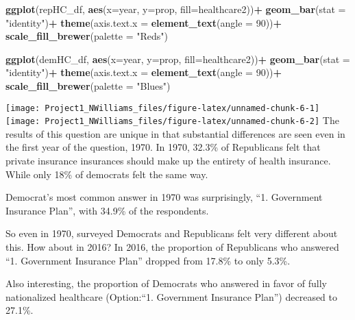 \documentclass[
]{article}
\newenvironment{Shaded}{\begin{snugshade}}{\end{snugshade}}
\newcommand{\DataTypeTok}[1]{\textcolor[rgb]{0.13,0.29,0.53}{#1}}
\newcommand{\DecValTok}[1]{\textcolor[rgb]{0.00,0.00,0.81}{#1}}
\newcommand{\KeywordTok}[1]{\textcolor[rgb]{0.13,0.29,0.53}{\textbf{#1}}}
\newcommand{\NormalTok}[1]{#1}
\newcommand{\OperatorTok}[1]{\textcolor[rgb]{0.81,0.36,0.00}{\textbf{#1}}}
\newcommand{\StringTok}[1]{\textcolor[rgb]{0.31,0.60,0.02}{#1}}
\begin{document}
\begin{Shaded}
\begin{Highlighting}[]
\KeywordTok{ggplot}\NormalTok{(repHC_df, }\KeywordTok{aes}\NormalTok{(}\DataTypeTok{x=}\NormalTok{year, }\DataTypeTok{y=}\NormalTok{prop, }\DataTypeTok{fill=}\NormalTok{healthcare2))}\OperatorTok{+}
\StringTok{  }\KeywordTok{geom_bar}\NormalTok{(}\DataTypeTok{stat =} \StringTok{"identity"}\NormalTok{)}\OperatorTok{+}
\StringTok{  }\KeywordTok{theme}\NormalTok{(}\DataTypeTok{axis.text.x =} \KeywordTok{element_text}\NormalTok{(}\DataTypeTok{angle =} \DecValTok{90}\NormalTok{))}\OperatorTok{+}
\StringTok{  }\KeywordTok{scale_fill_brewer}\NormalTok{(}\DataTypeTok{palette =} \StringTok{"Reds"}\NormalTok{)}

\KeywordTok{ggplot}\NormalTok{(demHC_df, }\KeywordTok{aes}\NormalTok{(}\DataTypeTok{x=}\NormalTok{year, }\DataTypeTok{y=}\NormalTok{prop, }\DataTypeTok{fill=}\NormalTok{healthcare2))}\OperatorTok{+}
\StringTok{  }\KeywordTok{geom_bar}\NormalTok{(}\DataTypeTok{stat =} \StringTok{"identity"}\NormalTok{)}\OperatorTok{+}
\StringTok{  }\KeywordTok{theme}\NormalTok{(}\DataTypeTok{axis.text.x =} \KeywordTok{element_text}\NormalTok{(}\DataTypeTok{angle =} \DecValTok{90}\NormalTok{))}\OperatorTok{+}
\StringTok{  }\KeywordTok{scale_fill_brewer}\NormalTok{(}\DataTypeTok{palette =} \StringTok{"Blues"}\NormalTok{)}
\end{Highlighting}
\end{Shaded}

\texttt{[image: Project1\_NWilliams\_files/figure-latex/unnamed-chunk-6-1]}
\texttt{[image: Project1\_NWilliams\_files/figure-latex/unnamed-chunk-6-2]}
The results of this question are unique in that substantial differences
are seen even in the first year of the question, 1970. In 1970, 32.3\%
of Republicans felt that private insurance insurances should make up the
entirety of health insurance. While only 18\% of democrats felt the same
way.

Democrat's most common answer in 1970 was surprisingly, ``1. Government
Insurance Plan'', with 34.9\% of the respondents.

So even in 1970, surveyed Democrats and Republicans felt very different
about this. How about in 2016? In 2016, the proportion of Republicans
who answered ``1. Government Insurance Plan'' dropped from 17.8\% to
only 5.3\%.

Also interesting, the proportion of Democrats who answered in favor of
fully nationalized healthcare (Option:``1. Government Insurance Plan'')
decreased to 27.1\%.
\end{document}
